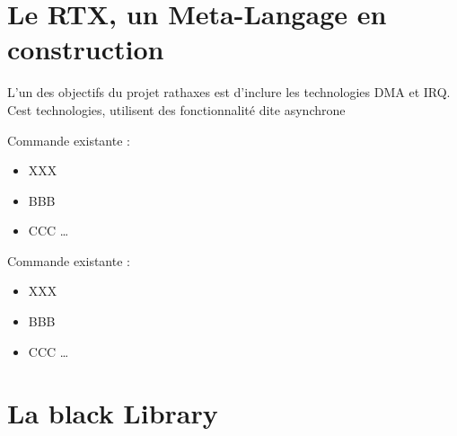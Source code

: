 \documentclass{rtxreport}
\begin{document}
\section{Le RTX, un Meta-Langage en construction}

L'un des objectifs du projet rathaxes est d'inclure les technologies DMA et IRQ.
Cest technologies, utilisent des fonctionnalité dite asynchrone

Commande existante :

\begin{itemize}
\item XXX
\item BBB
\item CCC \ldots
\end{itemize}

Commande existante :

\begin{itemize}
\item XXX
\item BBB
\item CCC \ldots
\end{itemize}

\section{La black Library}
\end{document}
